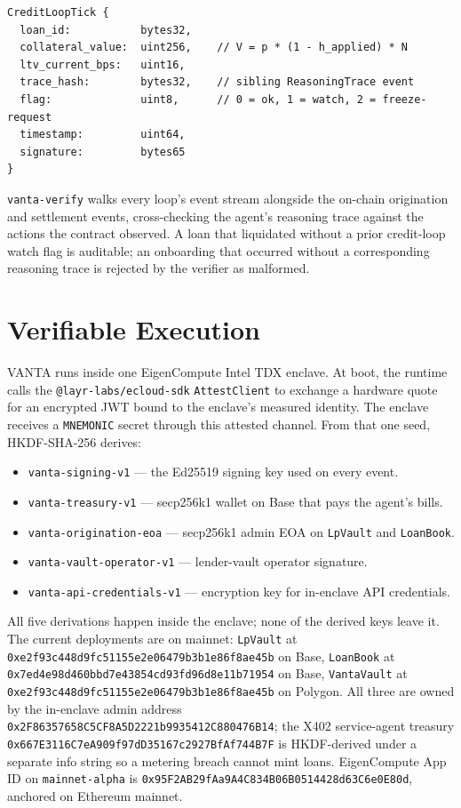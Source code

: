 \documentclass[11pt,letterpaper]{article}
\begin{document}
\begin{lstlisting}
CreditLoopTick {
  loan_id:           bytes32,
  collateral_value:  uint256,    // V = p * (1 - h_applied) * N
  ltv_current_bps:   uint16,
  trace_hash:        bytes32,    // sibling ReasoningTrace event
  flag:              uint8,      // 0 = ok, 1 = watch, 2 = freeze-request
  timestamp:         uint64,
  signature:         bytes65
}
\end{lstlisting}

\texttt{vanta-verify} walks every loop's event stream alongside the on-chain origination and settlement events, cross-checking the agent's reasoning trace against the actions the contract observed. A loan that liquidated without a prior credit-loop watch flag is auditable; an onboarding that occurred without a corresponding reasoning trace is rejected by the verifier as malformed.

\section{Verifiable Execution}
\label{sec:verify}

VANTA runs inside one EigenCompute Intel TDX enclave. At boot, the runtime calls the \texttt{@layr-labs/ecloud-sdk} \texttt{AttestClient} to exchange a hardware quote for an encrypted JWT bound to the enclave's measured identity. The enclave receives a \texttt{MNEMONIC} secret through this attested channel. From that one seed, HKDF-SHA-256 derives:

\begin{itemize}[leftmargin=*,itemsep=2pt,topsep=2pt]
  \item \texttt{vanta-signing-v1} --- the Ed25519 signing key used on every event.
  \item \texttt{vanta-treasury-v1} --- secp256k1 wallet on Base that pays the agent's bills.
  \item \texttt{vanta-origination-eoa} --- secp256k1 admin EOA on \texttt{LpVault} and \texttt{LoanBook}.
  \item \texttt{vanta-vault-operator-v1} --- lender-vault operator signature.
  \item \texttt{vanta-api-credentials-v1} --- encryption key for in-enclave API credentials.
\end{itemize}

All five derivations happen inside the enclave; none of the derived keys leave it. The current deployments are on mainnet: \texttt{LpVault} at \texttt{0xe2f93c448d9fc51155e2e06479b3b1e86f8ae45b} on Base, \texttt{LoanBook} at \texttt{0x7ed4e98d460bbd7e43854cd93fd96d8e11b71954} on Base, \texttt{VantaVault} at \texttt{0xe2f93c448d9fc51155e2e06479b3b1e86f8ae45b} on Polygon. All three are owned by the in-enclave admin address \texttt{0x2F86357658C5CF8A5D2221b9935412C880476B14}; the X402 service-agent treasury \texttt{0x667E3116C7eA909f97dD35167c2927BfAf744B7F} is HKDF-derived under a separate info string so a metering breach cannot mint loans. EigenCompute App ID on \texttt{mainnet-alpha} is \texttt{0x95F2AB29fAa9A4C834B06B0514428d63C6e0E80d}, anchored on Ethereum mainnet.
\end{document}
